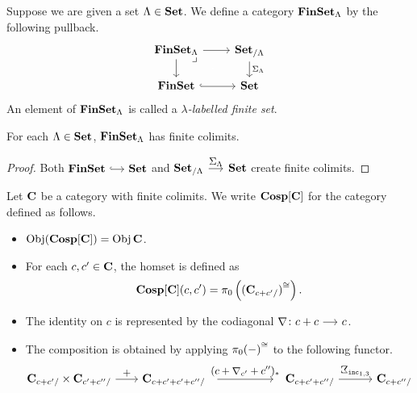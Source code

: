 \documentclass[a4paper,dvipsnames, 11pt]{amsart} %
\begin{document}
\begin{definition}
	Suppose we are given
	a set $\Lambda\in\mathbf{Set}$.
	We define a category
	$\mathbf{FinSet}_\Lambda$ by the following pullback.
	\[
		\begin{tikzcd}[row sep=5mm]
			\FinSet_\Lambda
			\ar[r]
			\ar[d]
			\pullback[rd]
				&
				\Set_{/\Lambda}
				\ar[d,"\Sigma_\Lambda"]
			\\
			\FinSet
			\ar[r,hook]
				&
				\Set
		\end{tikzcd}
	\]
	An element of $\mathbf{FinSet}_\Lambda$ is called a
	\emph{$\lambda$-labelled finite set}.
\end{definition}
\begin{proposition}
	For each $\Lambda\in\mathbf{Set}$,
	$\mathbf{FinSet}_\Lambda$ has finite colimits.
\end{proposition}
\begin{proof}
	Both $\FinSet\arr[hook]\Set$ and $\Set_{/\Lambda}\arr"\Sigma_\Lambda"\Set$ create finite colimits.
\end{proof}
\begin{definition}
	Let $\mathbf{C}$ be a category with finite colimits.
	We write $\Cosp[\one{C}]$ for the category defined as follows.
	\begin{itemize}
		\item %
			$\Obj(\Cosp[\one{C}])=\Obj{\one{C}}$.
		\item %
			For each $c,c'\in\mathbf{C}$,
			the homset is defined as
			\[
				\Cosp[\one{C}](c,c')=\pi_0\left(\core{(\one{C}_{c+c'/})}\right)
				\text{.}
			\]
		\item %
			The identity on $c$ is represented by the codiagonal $\Atled\colon c+c\arr c$.
		\item %
			The composition is obtained by applying $\pi_0{(-)}^{\cong}$ to the following functor.
			\[
				\one{C}_{c+c'/}
				\times
				\one{C}_{c'+c''/}
				\arr"+"[][2]
				\one{C}_{c+c'+c'+c''/}
				\arr"{(c+\Atled_{c'}+c'')_*}"[][5]
				\one{C}_{c+c'+c''/}
				\arr"{\arbSigma_{\inc_{1,3}}}"[][3]
				\one{C}_{c+c''/}
			\]
		\qedhere %
	\end{itemize}
\end{definition}
\end{document}
